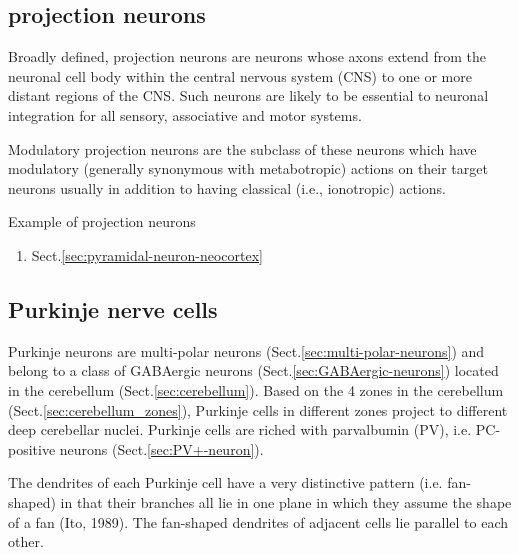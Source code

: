 \subsection{projection neurons}
\label{sec:projection-neurons}

Broadly defined, projection neurons are neurons whose axons extend from the
neuronal cell body within the central nervous system (CNS) to one or more
distant regions of the CNS. Such neurons are likely to be essential to neuronal
integration for all sensory, associative and motor systems.

Modulatory projection neurons are the subclass of these neurons which have
modulatory (generally synonymous with metabotropic) actions on their target
neurons usually in addition to having classical (i.e., ionotropic) actions.

Example of projection neurons
\begin{enumerate}
  \item Sect.\ref{sec:pyramidal-neuron-neocortex}
\end{enumerate}

\subsection{Purkinje nerve cells}
\label{sec:Purkinjie_nerves}
\label{sec:mossy-fiber}
\label{sec:climbing-fiber}

Purkinje neurons are multi-polar neurons (Sect.\ref{sec:multi-polar-neurons})
and belong to a class of GABAergic neurons (Sect.\ref{sec:GABAergic-neurons})
located in the cerebellum (Sect.\ref{sec:cerebellum}). Based on the 4 zones in
the cerebellum (Sect.\ref{sec:cerebellum_zones}), Purkinje cells in different
zones project to different deep cerebellar nuclei.
Purkinje cells are riched with parvalbumin (PV), i.e. PC-positive neurons
(Sect.\ref{sec:PV+-neuron}).

The dendrites of each Purkinje cell have a very distinctive pattern (i.e.
fan-shaped) in that their branches all lie in one plane in which they assume the
shape of a fan (Ito, 1989).
The fan-shaped dendrites of adjacent cells lie parallel to each other.

